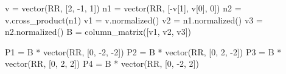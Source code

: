 \documentclass{amsart}
\begin{document}
\begin{sageblock}
v = vector(RR, [2, -1, 1])
n1 = vector(RR, [-v[1], v[0], 0])
n2 = v.cross_product(n1)
v1 = v.normalized()
v2 = n1.normalized()
v3 = n2.normalized()
B = column_matrix([v1, v2, v3])

P1 = B * vector(RR, [0, -2, -2])
P2 = B * vector(RR, [0, 2, -2])
P3 = B * vector(RR, [0, 2, 2])
P4 = B * vector(RR, [0, -2, 2])
\end{sageblock}

\begin{sagesub}
\begin{center}
\end{center}
\end{sagesub}


\end{document}
